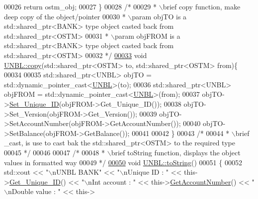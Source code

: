 \begin{DoxyCode}
00026     \textcolor{keywordflow}{return} ostm\_obj;
00027 \}
00028 \textcolor{comment}{/*}
00029 \textcolor{comment}{ * \(\backslash\)brief copy function, make deep copy of the object/pointer}
00030 \textcolor{comment}{ * \(\backslash\)param objTO is a std::shared\_ptr<BANK> type object casted back from std::shared\_ptr<OSTM>}
00031 \textcolor{comment}{ * \(\backslash\)param objFROM is a std::shared\_ptr<BANK> type object casted back from std::shared\_ptr<OSTM>}
00032 \textcolor{comment}{ */}
\hypertarget{_u_n_b_l_8cpp_source.tex_l00033}{}\hyperlink{class_u_n_b_l_a14d5e1adc618827667d8d9524abaf31b_a14d5e1adc618827667d8d9524abaf31b}{00033} \textcolor{keywordtype}{void} \hyperlink{class_u_n_b_l_a14d5e1adc618827667d8d9524abaf31b_a14d5e1adc618827667d8d9524abaf31b}{UNBL::copy}(std::shared\_ptr<OSTM> to, std::shared\_ptr<OSTM> from)\{
00034 
00035     std::shared\_ptr<UNBL> objTO = std::dynamic\_pointer\_cast<\hyperlink{class_u_n_b_l}{UNBL}>(to);
00036     std::shared\_ptr<UNBL> objFROM = std::dynamic\_pointer\_cast<\hyperlink{class_u_n_b_l}{UNBL}>(from);
00037     objTO->\hyperlink{class_o_s_t_m_ab5019a32185631c08abbf826422f2d93_ab5019a32185631c08abbf826422f2d93}{Set\_Unique\_ID}(objFROM->Get\_Unique\_ID());
00038     objTO->Set\_Version(objFROM->Get\_Version());
00039     objTO->SetAccountNumber(objFROM->GetAccountNumber());
00040     objTO->SetBalance(objFROM->GetBalance());
00041    
00042 \}
00043 \textcolor{comment}{/*}
00044 \textcolor{comment}{ * \(\backslash\)brief \_cast, is use to cast bak the std::shared\_ptr<OSTM> to the required type}
00045 \textcolor{comment}{ */}
00046 
00047 \textcolor{comment}{/*}
00048 \textcolor{comment}{ *  \(\backslash\)brief toString function, displays the object values in formatted way}
00049 \textcolor{comment}{ */}
\hypertarget{_u_n_b_l_8cpp_source.tex_l00050}{}\hyperlink{class_u_n_b_l_a76d8bba21d64d79d8de63763b8acc1fd_a76d8bba21d64d79d8de63763b8acc1fd}{00050} \textcolor{keywordtype}{void} \hyperlink{class_u_n_b_l_a76d8bba21d64d79d8de63763b8acc1fd_a76d8bba21d64d79d8de63763b8acc1fd}{UNBL::toString}()
00051 \{
00052    std::cout << \textcolor{stringliteral}{"\(\backslash\)nUNBL BANK"} << \textcolor{stringliteral}{"\(\backslash\)nUnique ID : "} << this->\hyperlink{class_o_s_t_m_a5a01a8b98d16b1d1904ecf9356e7b71d_a5a01a8b98d16b1d1904ecf9356e7b71d}{Get\_Unique\_ID}() << \textcolor{stringliteral}{"\(\backslash\)nInt account :
       "} << this->\hyperlink{class_u_n_b_l_a44a84fb7fe8778e3048921581049c715_a44a84fb7fe8778e3048921581049c715}{GetAccountNumber}() << \textcolor{stringliteral}{"\(\backslash\)nDouble value : "} << this->

\end{DoxyCode}
